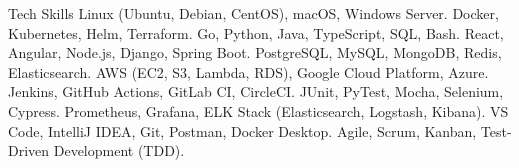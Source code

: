 
\begin{rubric}{Tech Skills}
  Linux (Ubuntu, Debian, CentOS), macOS, Windows Server.
  Docker, Kubernetes, Helm, Terraform.
  Go, Python, Java, TypeScript, SQL, Bash.
  React, Angular, Node.js, Django, Spring Boot.
\entry*[Databases]
  PostgreSQL, MySQL, MongoDB, Redis, Elasticsearch.
  AWS (EC2, S3, Lambda, RDS), Google Cloud Platform, Azure.
\entry*[CI/CD \& DevOps]
  Jenkins, GitHub Actions, GitLab CI, CircleCI.
\entry*[Testing]
  JUnit, PyTest, Mocha, Selenium, Cypress.
  Prometheus, Grafana, ELK Stack (Elasticsearch, Logstash, Kibana).
  VS Code, IntelliJ IDEA, Git, Postman, Docker Desktop.
\entry*[Methodologies]
  Agile, Scrum, Kanban, Test-Driven Development (TDD).
\end{rubric}
